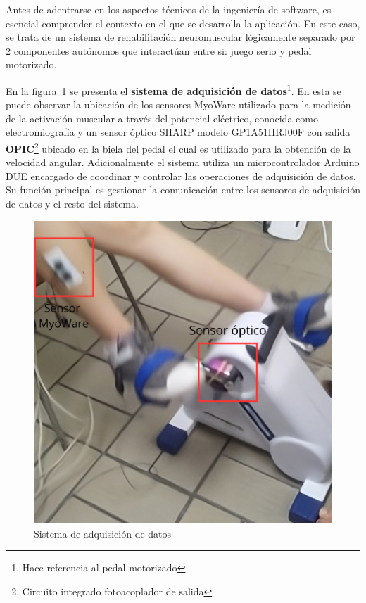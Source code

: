 Antes de adentrarse en los aspectos técnicos de la ingeniería de software, es esencial comprender el contexto en el que se desarrolla la aplicación. En este caso, se trata de un sistema de rehabilitación neuromuscular lógicamente separado por 2 componentes autónomos que interactúan entre si: juego serio y pedal motorizado. 

En la figura~\ref{fig: sa} se presenta el \textbf{sistema de adquisición de datos}\footnote{Hace referencia al pedal motorizado}. En esta se puede observar la ubicación de los sensores MyoWare utilizado para la medición de la activación muscular a través del potencial eléctrico, conocida como electromiografía y un sensor óptico SHARP modelo GP1A51HRJ00F con salida \textbf{OPIC}\footnote{Circuito integrado fotoacoplador de salida} ubicado en la biela del pedal el cual es utilizado para la obtención de la velocidad angular. Adicionalmente el sistema utiliza un microcontrolador Arduino DUE encargado de coordinar y controlar las operaciones de adquisición de datos. Su función principal es gestionar la comunicación entre los sensores de adquisición de datos y el resto del sistema.

\begin{figure}[ht]
    \centering
    \includegraphics[scale=0.2]{images/sa.png}
    \caption{Sistema de adquisición de datos}
    \label{fig: sa}
\end{figure}    

